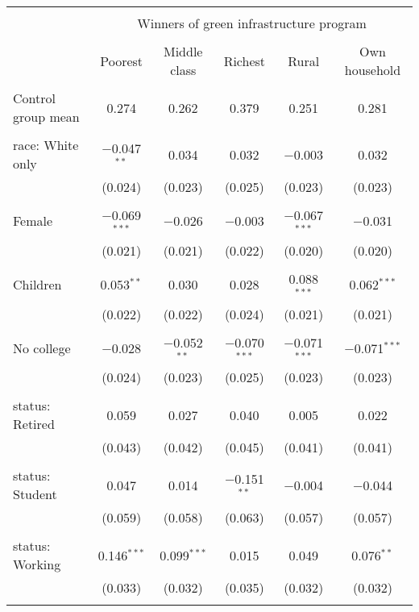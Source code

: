 
\begin{tabular}{@{\extracolsep{5pt}}lccccc} 
\\[-1.8ex]\hline 
\hline \\[-1.8ex] 
 & \multicolumn{5}{c}{Winners of green infrastructure program} \\ 
\cline{2-6} 
\\[-1.8ex] & Poorest & Middle class & Richest & Rural & Own household \\ 
\hline \\[-1.8ex] 
 Control group mean & 0.274 & 0.262 & 0.379 & 0.251 & 0.281  \\ \hline \\[-1.8ex] race: White only & $-$0.047$^{**}$ & 0.034 & 0.032 & $-$0.003 & 0.032 \\ 
  & (0.024) & (0.023) & (0.025) & (0.023) & (0.023) \\ 
  & & & & & \\ 
 Female & $-$0.069$^{***}$ & $-$0.026 & $-$0.003 & $-$0.067$^{***}$ & $-$0.031 \\ 
  & (0.021) & (0.021) & (0.022) & (0.020) & (0.020) \\ 
  & & & & & \\ 
 Children & 0.053$^{**}$ & 0.030 & 0.028 & 0.088$^{***}$ & 0.062$^{***}$ \\ 
  & (0.022) & (0.022) & (0.024) & (0.021) & (0.021) \\ 
  & & & & & \\ 
 No college & $-$0.028 & $-$0.052$^{**}$ & $-$0.070$^{***}$ & $-$0.071$^{***}$ & $-$0.071$^{***}$ \\ 
  & (0.024) & (0.023) & (0.025) & (0.023) & (0.023) \\ 
  & & & & & \\ 
 status: Retired & 0.059 & 0.027 & 0.040 & 0.005 & 0.022 \\ 
  & (0.043) & (0.042) & (0.045) & (0.041) & (0.041) \\ 
  & & & & & \\ 
 status: Student & 0.047 & 0.014 & $-$0.151$^{**}$ & $-$0.004 & $-$0.044 \\ 
  & (0.059) & (0.058) & (0.063) & (0.057) & (0.057) \\ 
  & & & & & \\ 
 status: Working & 0.146$^{***}$ & 0.099$^{***}$ & 0.015 & 0.049 & 0.076$^{**}$ \\ 
  & (0.033) & (0.032) & (0.035) & (0.032) & (0.032) \\ 
  & & & & & \\ 

\end{tabular}
